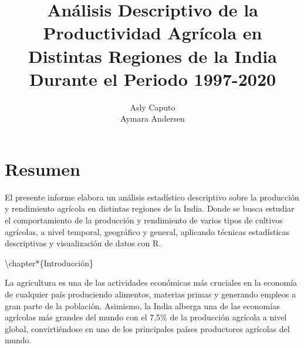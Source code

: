 \documentclass[oneside,11pt]{Latex/Classes/PhDthesisPSnPDF}
\title{Análisis Descriptivo de la Productividad Agrícola en Distintas
Regiones de la India Durante el Periodo 1997-2020}
\author{Asly Caputo \\ Aymara Andersen}
\begin{document}
\maketitle

\frontmatter


\setcounter{secnumdepth}{3}
\setcounter{tocdepth}{3}

\tableofcontents



\cleardoublepage

  \cleardoublepage       %
  \chapter*{Resumen}     %
  
  El presente informe elabora un análisis estadístico descriptivo sobre
la producción y rendimiento agrícola en distintas regiones de la India.
Donde se busca estudiar el comportamiento de la producción y rendimiento
de varios tipos de cultivos agrícolas, a nivel temporal, geográfico y
general, aplicando técnicas estadísticas descriptivas y visualización de
datos con
R.             %
  
  \cleardoublepage

\mainmatter
\def\baselinestretch{1.5}

\textbackslash chapter*\{Introducción\}

La agricultura es una de las actividades económicas más cruciales en la
economía de cualquier país produciendo alimentos, materias primas y
generando empleos a gran parte de la población. Asimismo, la India
alberga una de las economías agrícolas más grandes del mundo con el
7,5\% de la producción agrícola a nivel global, convirtiéndose en uno de
los principales países productores agrícolas del mundo.\\
\end{document}
